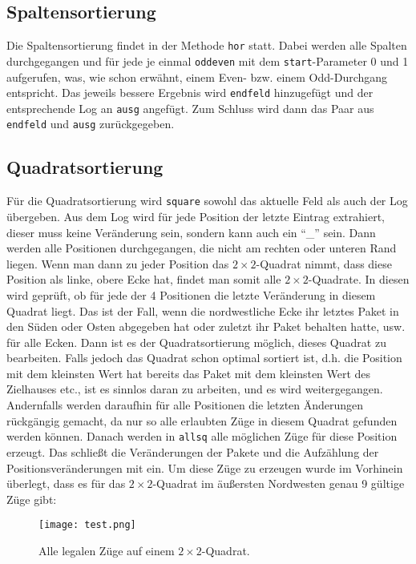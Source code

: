 \documentclass[12pt]{article}
\begin{document}
\subsection{Spaltensortierung}
Die Spaltensortierung findet in der Methode \texttt{hor} statt. Dabei werden alle Spalten durchgegangen und für jede je einmal \texttt{oddeven} mit dem \texttt{start}-Parameter 0 und 1 aufgerufen, was, wie schon erwähnt, einem Even- bzw. einem Odd-Durchgang entspricht. Das jeweils bessere Ergebnis wird \texttt{endfeld} hinzugefügt und der entsprechende Log an \texttt{ausg} angefügt. Zum Schluss wird dann das Paar aus \texttt{endfeld} und \texttt{ausg} zurückgegeben.

\subsection{Quadratsortierung}
Für die Quadratsortierung wird \texttt{square} sowohl das aktuelle Feld als auch der Log übergeben. Aus dem Log wird für jede Position der letzte Eintrag extrahiert, dieser muss keine Veränderung sein, sondern kann auch ein ``\_'' sein. Dann werden alle Positionen durchgegangen, die nicht am rechten oder unteren Rand liegen. Wenn man dann zu jeder Position das $2\times 2$-Quadrat nimmt, dass diese Position als linke, obere Ecke hat, findet man somit alle $2\times2$-Quadrate. In diesen wird geprüft, ob für jede der 4 Positionen die letzte Veränderung in diesem Quadrat liegt. Das ist der Fall, wenn die nordwestliche Ecke ihr letztes Paket in den Süden oder Osten abgegeben hat oder zuletzt ihr Paket behalten hatte, usw. für alle Ecken. Dann ist es der Quadratsortierung möglich, dieses Quadrat zu bearbeiten. Falls jedoch das Quadrat schon optimal sortiert ist, d.h. die Position mit dem kleinsten Wert hat bereits das Paket mit dem kleinsten Wert des Zielhauses etc., ist es sinnlos daran zu arbeiten, und es wird weitergegangen. Andernfalls werden daraufhin für alle Positionen die letzten Änderungen rückgängig gemacht, da nur so alle erlaubten Züge in diesem Quadrat gefunden werden können. Danach werden in \texttt{allsq} alle möglichen Züge für diese Position erzeugt. Das schließt die Veränderungen der Pakete und die Aufzählung der Positionsveränderungen mit ein. Um diese Züge zu erzeugen wurde im Vorhinein überlegt, dass es für das $2\times2$-Quadrat im äußersten Nordwesten genau 9 gültige Züge gibt:\\
\begin{figure}[h]
 \centering
 \texttt{[image: test.png]}
 \caption{Alle legalen Züge auf einem $2\times2$-Quadrat.}
\end{figure}
 
\end{document}
